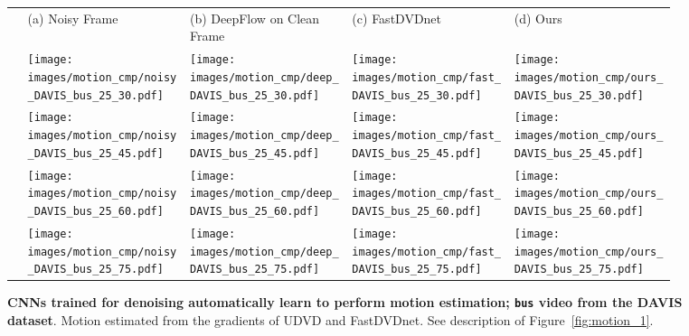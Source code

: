 \documentclass[final]{cvpr}
\begin{document}
\begin{figure*}[ht]
    \def\f1ht{\linewidth}

     \centering 
     \begin{tabular}{ >{\centering\arraybackslash}m{0.02\linewidth}
     >{\centering\arraybackslash}m{0.23\linewidth}
     >{\centering\arraybackslash}m{0.23\linewidth}
     >{\centering\arraybackslash}m{0.23\linewidth}
     >{\centering\arraybackslash}m{0.23\linewidth}
     }
     \centering
     
      & 
     \footnotesize{(a) Noisy Frame} &
     \footnotesize{(b) DeepFlow on Clean Frame} &
     \footnotesize{(c) FastDVDnet} &
     \footnotesize{(d) Ours} \\
     
     30 & \texttt{[image: images/motion\_cmp/noisy\_DAVIS\_bus\_25\_30.pdf]} &
     \texttt{[image: images/motion\_cmp/deep\_DAVIS\_bus\_25\_30.pdf]} &
     \texttt{[image: images/motion\_cmp/fast\_DAVIS\_bus\_25\_30.pdf]} &
     \texttt{[image: images/motion\_cmp/ours\_DAVIS\_bus\_25\_30.pdf]} \\
     
     45 & \texttt{[image: images/motion\_cmp/noisy\_DAVIS\_bus\_25\_45.pdf]} &
     \texttt{[image: images/motion\_cmp/deep\_DAVIS\_bus\_25\_45.pdf]} &
     \texttt{[image: images/motion\_cmp/fast\_DAVIS\_bus\_25\_45.pdf]} &
     \texttt{[image: images/motion\_cmp/ours\_DAVIS\_bus\_25\_45.pdf]} \\
     
     60 & \texttt{[image: images/motion\_cmp/noisy\_DAVIS\_bus\_25\_60.pdf]} &
     \texttt{[image: images/motion\_cmp/deep\_DAVIS\_bus\_25\_60.pdf]} &
     \texttt{[image: images/motion\_cmp/fast\_DAVIS\_bus\_25\_60.pdf]} &
     \texttt{[image: images/motion\_cmp/ours\_DAVIS\_bus\_25\_60.pdf]} \\
     
     75 & \texttt{[image: images/motion\_cmp/noisy\_DAVIS\_bus\_25\_75.pdf]} &
     \texttt{[image: images/motion\_cmp/deep\_DAVIS\_bus\_25\_75.pdf]} &
     \texttt{[image: images/motion\_cmp/fast\_DAVIS\_bus\_25\_75.pdf]} &
     \texttt{[image: images/motion\_cmp/ours\_DAVIS\_bus\_25\_75.pdf]} \\
     
     \end{tabular}
     
     \vspace{0.2cm}
     
\caption{\textbf{CNNs trained for denoising automatically learn to perform motion estimation; \texttt{bus} video from the DAVIS dataset}. 
Motion estimated from the gradients of UDVD and FastDVDnet. See description of Figure~\ref{fig:motion_1}.}
\label{fig:motion_4}
\end{figure*}
\end{document}
